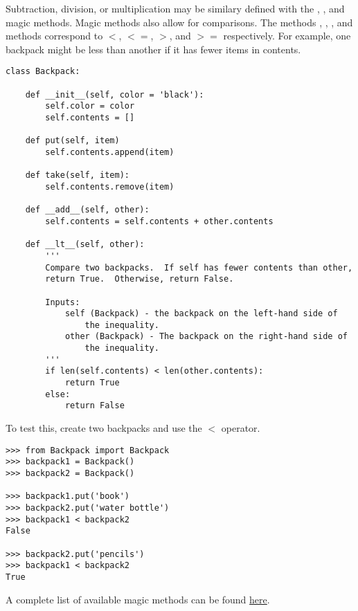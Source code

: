 Subtraction, division, or multiplication may be similary defined with the , , and  magic methods.
Magic methods also allow for comparisons.
The methods , , , and  methods correspond to $<$, $<=$, $>$, and $>=$ respectively.
For example, one backpack might be less than another if it has fewer items in contents.

\begin{lstlisting}
class Backpack:
	
	def __init__(self, color = 'black'):
		self.color = color
		self.contents = []

	def put(self, item)
		self.contents.append(item)

	def take(self, item):
		self.contents.remove(item)

	def __add__(self, other):
		self.contents = self.contents + other.contents

	def __lt__(self, other):
		'''
		Compare two backpacks.  If self has fewer contents than other,
		return True.  Otherwise, return False.

		Inputs:
			self (Backpack) - the backpack on the left-hand side of
			    the inequality.
			other (Backpack) - The backpack on the right-hand side of
			    the inequality.
		'''
		if len(self.contents) < len(other.contents):
			return True
		else:
			return False
\end{lstlisting}

To test this, create two backpacks and use the $<$ operator.
\begin{lstlisting}
>>> from Backpack import Backpack
>>> backpack1 = Backpack()
>>> backpack2 = Backpack()

>>> backpack1.put('book')
>>> backpack2.put('water bottle')
>>> backpack1 < backpack2
False

>>> backpack2.put('pencils')
>>> backpack1 < backpack2
True
\end{lstlisting}

A complete list of available magic methods can be found \href{https://docs.python.org/2/reference/datamodel.html#special-method-names}{here}.

